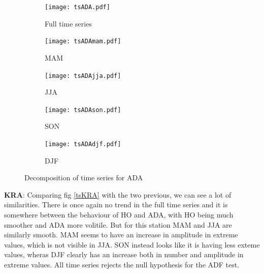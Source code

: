\documentclass{article}
\begin{document}
	\begin{figure}[H]
		\centering
		\begin{subfigure}{0.6\textwidth}
			\centering
			\texttt{[image: tsADA.pdf]}
			\caption{Full time series}
		\end{subfigure}
		\begin{subfigure}{0.5\textwidth}
			\centering
			\texttt{[image: tsADAmam.pdf]}
			\caption{MAM}
		\end{subfigure}%
		\begin{subfigure}{0.5\textwidth}
			\centering
			\texttt{[image: tsADAjja.pdf]}
			\caption{JJA}
		\end{subfigure}
		\begin{subfigure}{0.5\textwidth}
			\centering
			\texttt{[image: tsADAson.pdf]}
			\caption{SON}
		\end{subfigure}%
		\begin{subfigure}{0.5\textwidth}
			\centering
			\texttt{[image: tsADAdjf.pdf]}
			\caption{DJF}
		\end{subfigure}%
		\caption{Decomposition of time series for ADA}
		\label{tsADA}
	\end{figure}

	{\Large\textbf{KRA}}: Comparing fig \ref{tsKRA} with the two previous, we can see a lot of similarities. There is once again no trend in the full time series and it is somewhere between the behaviour of HO and ADA, with HO being much smoother and ADA more volitile. But for this station MAM and JJA are similarly smooth. MAM seems to have an increase in amplitude in extreme values, which is not visible in JJA. SON instead looks like it is having less exteme values, wheras DJF clearly has an increase both in number and amplitude in extreme values. All time series rejects the null hypothesis for the ADF test.
	
\end{document}
